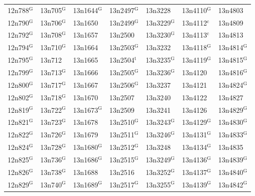 \documentclass[12pt, oneside]{amsart}
\begin{document}
{\begin{longtable}{*{7}{>{\raggedright\arraybackslash}p{}}}
12n788$^{\mathrm{G}}$ & 13n705$^{\mathrm{G}}$ & 13n1644$^{\mathrm{G}}$ & 13n2497$^{\mathrm{G}}$ & 13n3228 & 13n4110$^{\mathrm{G}}$ & 13n4803 \\
12n790$^{\mathrm{G}}$ & 13n706$^{\mathrm{G}}$ & 13n1650 & 13n2499$^{\mathrm{G}}$ & 13n3229$^{\mathrm{G}}$ & 13n4112$^{\mathrm{c}}$ & 13n4809 \\
12n792$^{\mathrm{G}}$ & 13n708$^{\mathrm{G}}$ & 13n1657 & 13n2500 & 13n3230$^{\mathrm{G}}$ & 13n4113$^{\mathrm{c}}$ & 13n4813 \\
12n794$^{\mathrm{G}}$ & 13n710$^{\mathrm{G}}$ & 13n1664 & 13n2503$^{\mathrm{G}}$ & 13n3232 & 13n4118$^{\mathrm{G}}$ & 13n4814$^{\mathrm{G}}$ \\
12n795$^{\mathrm{G}}$ & 13n712 & 13n1665 & 13n2504$^{\mathrm{t}}$ & 13n3235$^{\mathrm{G}}$ & 13n4119$^{\mathrm{G}}$ & 13n4815$^{\mathrm{G}}$ \\
12n799$^{\mathrm{G}}$ & 13n713$^{\mathrm{G}}$ & 13n1666 & 13n2505$^{\mathrm{G}}$ & 13n3236$^{\mathrm{G}}$ & 13n4120 & 13n4816$^{\mathrm{G}}$ \\
12n800$^{\mathrm{G}}$ & 13n717$^{\mathrm{G}}$ & 13n1667 & 13n2506$^{\mathrm{G}}$ & 13n3237 & 13n4121 & 13n4824$^{\mathrm{G}}$ \\
12n802$^{\mathrm{G}}$ & 13n718$^{\mathrm{G}}$ & 13n1670 & 13n2507 & 13n3240 & 13n4122 & 13n4827 \\
12n819$^{\mathrm{G}}$ & 13n722$^{\mathrm{G}}$ & 13n1673$^{\mathrm{G}}$ & 13n2509 & 13n3241 & 13n4126 & 13n4829$^{\mathrm{G}}$ \\
12n821$^{\mathrm{G}}$ & 13n723$^{\mathrm{G}}$ & 13n1678 & 13n2510$^{\mathrm{G}}$ & 13n3243$^{\mathrm{G}}$ & 13n4129$^{\mathrm{G}}$ & 13n4830$^{\mathrm{G}}$ \\
12n822$^{\mathrm{G}}$ & 13n726$^{\mathrm{G}}$ & 13n1679 & 13n2511$^{\mathrm{G}}$ & 13n3246$^{\mathrm{G}}$ & 13n4131$^{\mathrm{G}}$ & 13n4833$^{\mathrm{G}}$ \\
12n824$^{\mathrm{G}}$ & 13n728$^{\mathrm{G}}$ & 13n1680$^{\mathrm{G}}$ & 13n2512$^{\mathrm{G}}$ & 13n3248 & 13n4134$^{\mathrm{G}}$ & 13n4835 \\
12n825$^{\mathrm{G}}$ & 13n736$^{\mathrm{G}}$ & 13n1686$^{\mathrm{G}}$ & 13n2515$^{\mathrm{G}}$ & 13n3249$^{\mathrm{G}}$ & 13n4136$^{\mathrm{G}}$ & 13n4839$^{\mathrm{G}}$ \\
12n826$^{\mathrm{G}}$ & 13n738$^{\mathrm{G}}$ & 13n1688 & 13n2516 & 13n3252$^{\mathrm{G}}$ & 13n4137$^{\mathrm{G}}$ & 13n4840$^{\mathrm{G}}$ \\
12n829$^{\mathrm{G}}$ & 13n740$^{\mathrm{G}}$ & 13n1689$^{\mathrm{G}}$ & 13n2517$^{\mathrm{G}}$ & 13n3255$^{\mathrm{G}}$ & 13n4139$^{\mathrm{G}}$ & 13n4842$^{\mathrm{G}}$ \\

\end{longtable}}
\end{document}
